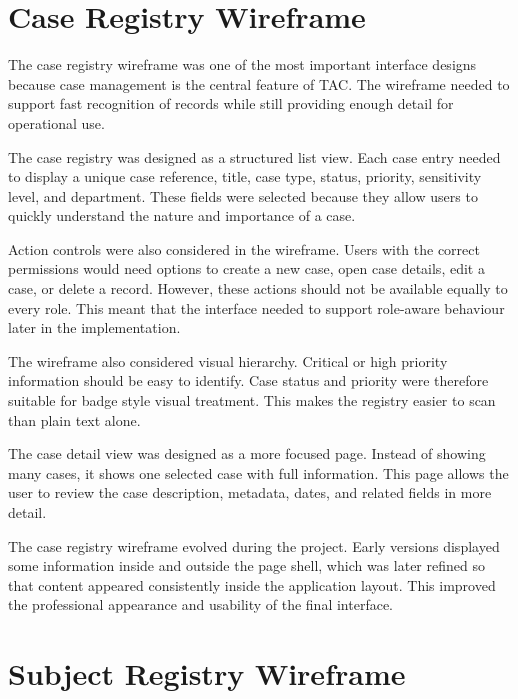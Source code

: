 \section{Case Registry Wireframe}

The case registry wireframe was one of the most important interface designs because case management is the central feature of TAC. The wireframe needed to support fast recognition of records while still providing enough detail for operational use.

The case registry was designed as a structured list view. Each case entry needed to display a unique case reference, title, case type, status, priority, sensitivity level, and department. These fields were selected because they allow users to quickly understand the nature and importance of a case.

Action controls were also considered in the wireframe. Users with the correct permissions would need options to create a new case, open case details, edit a case, or delete a record. However, these actions should not be available equally to every role. This meant that the interface needed to support role-aware behaviour later in the implementation.

The wireframe also considered visual hierarchy. Critical or high priority information should be easy to identify. Case status and priority were therefore suitable for badge style visual treatment. This makes the registry easier to scan than plain text alone.

The case detail view was designed as a more focused page. Instead of showing many cases, it shows one selected case with full information. This page allows the user to review the case description, metadata, dates, and related fields in more detail.

The case registry wireframe evolved during the project. Early versions displayed some information inside and outside the page shell, which was later refined so that content appeared consistently inside the application layout. This improved the professional appearance and usability of the final interface.


\section{Subject Registry Wireframe}

